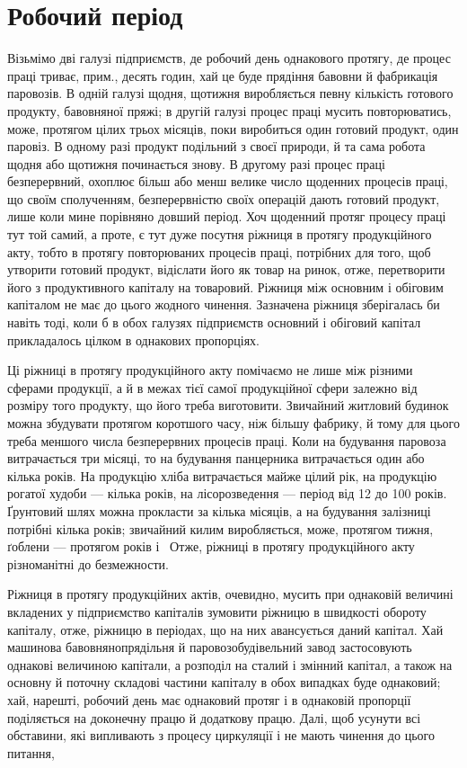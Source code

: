 
\section{Робочий період}

Візьмімо дві галузі підприємств, де робочий день однакового протягу,
де процес праці триває, прим., десять годин, хай це буде прядіння
бавовни й фабрикація паровозів. В одній галузі щодня, щотижня виробляється
певну кількість готового продукту, бавовняної пряжі; в другій
галузі процес праці мусить повторюватись, може, протягом цілих трьох
місяців, поки виробиться один готовий продукт, один паровіз. В одному
разі продукт подільний з своєї природи, й та сама робота щодня або
щотижня починається знову. В другому разі процес праці безперервний,
охоплює більш або менш велике число щоденних процесів праці, що своїм
сполученням, безперервністю своїх операцій дають готовий продукт, лише
коли мине порівняно довший період. Хоч щоденний протяг процесу праці
тут той самий, а проте, є тут дуже посутня ріжниця в протягу продукційного
акту, тобто в протягу повторюваних процесів праці, потрібних
для того, щоб утворити готовий продукт, відіслати його як товар на
ринок, отже, перетворити його з продуктивного капіталу на товаровий.
Ріжниця між основним і обіговим капіталом не має до цього жодного
чинення. Зазначена ріжниця зберігалась би навіть тоді, коли б в обох
галузях підприємств основний і обіговий капітал прикладалось цілком
в однакових пропорціях.

Ці ріжниці в протягу продукційного акту помічаємо не лише між
різними сферами продукції, а й в межах тієї самої продукційної сфери
залежно від розміру того продукту, що його треба виготовити. Звичайний
житловий будинок можна збудувати протягом коротшого часу,
ніж більшу фабрику, й тому для цього треба меншого числа безперервних
процесів праці. Коли на будування паровоза витрачається три місяці,
то на будування панцерника витрачається один або кілька років. На продукцію
хліба витрачається майже цілий рік, на продукцію рогатої худоби
— кілька років, на лісорозведення — період від 12 до 100 років. Ґрунтовий
шлях можна прокласти за кілька місяців, а на будування залізниці
потрібні кілька років; звичайний килим виробляється, може, протягом
тижня, ґоблени — протягом років і~ Отже, ріжниці в протягу продукційного
акту різноманітні до безмежности.

Ріжниця в протягу продукційних актів, очевидно, мусить при однаковій
величині вкладених у підприємство капіталів зумовити ріжницю в
швидкості обороту капіталу, отже, ріжницю в періодах, що на них авансується
даний капітал. Хай машинова бавовнянопрядільня й паровозобудівельний
завод застосовують однакові величиною капітали, а розподіл
на сталий і змінний капітал, а також на основну й поточну складові частини
капіталу в обох випадках буде однаковий; хай, нарешті, робочий
день має однаковий протяг і в однаковій пропорції поділяється на доконечну
працю й додаткову працю. Далі, щоб усунути всі обставини, які
випливають з процесу циркуляції і не мають чинення до цього питання,
\parbreak{}  %
